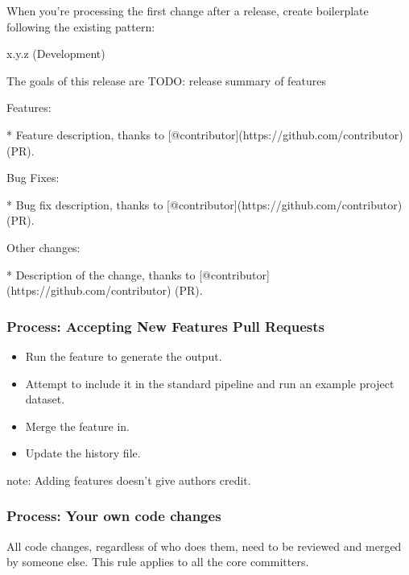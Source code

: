 \documentclass[letterpaper,10pt,english]{sphinxmanual}
\begin{document}
When you’re processing the first change after a release, create boilerplate following the existing pattern:

\begin{sphinxVerbatim}[commandchars=\\\{\}]
\PYGZsh{}\PYGZsh{} x.y.z (Development)

The goals of this release are TODO: release summary of features

Features:

* Feature description, thanks to [@contributor](https://github.com/contributor) (\PYGZsh{}PR).

Bug Fixes:

* Bug fix description, thanks to [@contributor](https://github.com/contributor) (\PYGZsh{}PR).

Other changes:

* Description of the change, thanks to [@contributor](https://github.com/contributor) (\PYGZsh{}PR).
\end{sphinxVerbatim}


\subsubsection{Process: Accepting New Features Pull Requests}
\label{\detokenize{MANIFEST:process-accepting-new-features-pull-requests}}\begin{itemize}
\item {} 
Run the feature to generate the output.

\item {} 
Attempt to include it in the standard pipeline and run an example project dataset.

\item {} 
Merge the feature in.

\item {} 
Update the history file.

\end{itemize}

note: Adding features doesn’t give authors credit.


\subsubsection{Process: Your own code changes}
\label{\detokenize{MANIFEST:process-your-own-code-changes}}
All code changes, regardless of who does them, need to be reviewed and merged by someone else.
This rule applies to all the core committers.
\end{document}
